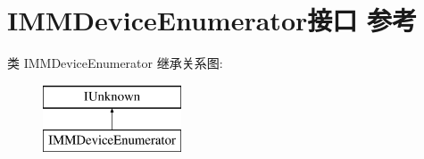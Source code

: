 \hypertarget{interface_i_m_m_device_enumerator}{}\section{I\+M\+M\+Device\+Enumerator接口 参考}
\label{interface_i_m_m_device_enumerator}
类 I\+M\+M\+Device\+Enumerator 继承关系图\+:\begin{figure}[H]
\begin{center}
\leavevmode
\includegraphics[height=2.000000cm]{interface_i_m_m_device_enumerator}
\end{center}
\end{figure}
